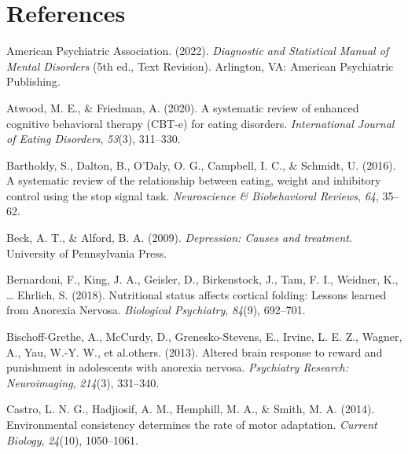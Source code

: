 \documentclass[
  man,floatsintext]{apa6}
\newlength{\cslhangindent}
\newlength{\cslentryspacingunit} %
\newenvironment{CSLReferences}[2] %
 {%
  \setlength{\parindent}{0pt}
  \ifodd #1
  \let\oldpar\par
  \def\par{\hangindent=\cslhangindent\oldpar}
  \fi
  \setlength{\parskip}{#2\cslentryspacingunit}
 }%
 {}
\begin{document}
\newpage

\hypertarget{references}{%
\section{References}\label{references}}

\hypertarget{refs}{}
\begin{CSLReferences}{1}{0}
\leavevmode{}%
American Psychiatric Association. (2022). \emph{{Diagnostic and Statistical Manual of Mental Disorders}} (5th ed., Text Revision). Arlington, VA: {American Psychiatric Publishing}.

\leavevmode{}%
Atwood, M. E., \& Friedman, A. (2020). A systematic review of enhanced cognitive behavioral therapy (CBT-e) for eating disorders. \emph{International Journal of Eating Disorders}, \emph{53}(3), 311--330.

\leavevmode{}%
Bartholdy, S., Dalton, B., O'Daly, O. G., Campbell, I. C., \& Schmidt, U. (2016). A systematic review of the relationship between eating, weight and inhibitory control using the stop signal task. \emph{Neuroscience \& Biobehavioral Reviews}, \emph{64}, 35--62.

\leavevmode{}%
Beck, A. T., \& Alford, B. A. (2009). \emph{Depression: Causes and treatment}. University of Pennsylvania Press.

\leavevmode{}%
Bernardoni, F., King, J. A., Geisler, D., Birkenstock, J., Tam, F. I., Weidner, K., \ldots{} Ehrlich, S. (2018). Nutritional status affects cortical folding: {Lessons} learned from {Anorexia} {Nervosa}. \emph{Biological Psychiatry}, \emph{84}(9), 692--701.

\leavevmode{}%
Bischoff-Grethe, A., McCurdy, D., Grenesko-Stevens, E., Irvine, L. E. Z., Wagner, A., Yau, W.-Y. W., et al.others. (2013). Altered brain response to reward and punishment in adolescents with anorexia nervosa. \emph{Psychiatry Research: Neuroimaging}, \emph{214}(3), 331--340.

\leavevmode{}%
Castro, L. N. G., Hadjiosif, A. M., Hemphill, M. A., \& Smith, M. A. (2014). Environmental consistency determines the rate of motor adaptation. \emph{Current Biology}, \emph{24}(10), 1050--1061.


\end{CSLReferences}
\end{document}
